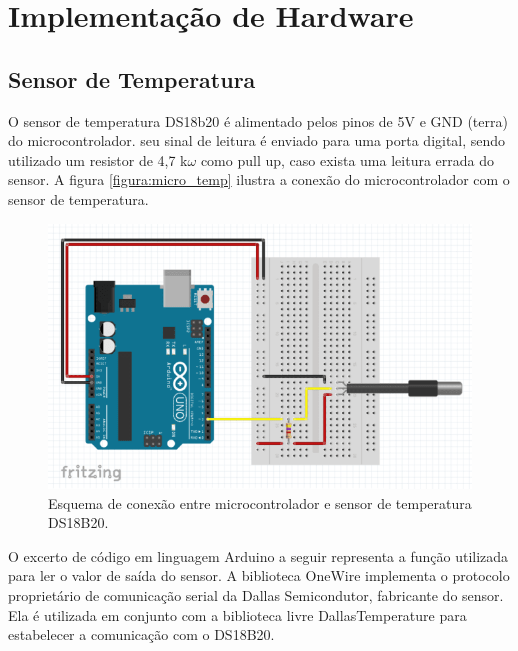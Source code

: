 \section{Implementação de Hardware}

\subsection{Sensor de Temperatura}

O sensor de temperatura DS18b20 é alimentado pelos pinos de 5V e GND (terra) do microcontrolador. seu sinal de leitura é enviado para uma porta digital, sendo utilizado um resistor de 4,7 k$\omega$ como pull up, caso exista uma leitura errada do sensor. A figura \ref{figura:micro_temp} ilustra a conexão do microcontrolador com o sensor de temperatura. 


\begin{figure}[h]
    \centering
    \includegraphics[scale=0.40]{figuras/implementacao/hardware/DSsensor.png}
    \caption{Esquema de conexão entre microcontrolador e sensor de temperatura DS18B20.}
    \label{fig:micro_temp}
\end{figure}


O excerto de código em linguagem Arduino a seguir representa a função utilizada para ler o valor de saída do sensor. A biblioteca OneWire implementa o protocolo proprietário de comunicação serial da Dallas Semicondutor, fabricante do sensor. Ela é utilizada em conjunto com a biblioteca livre DallasTemperature para estabelecer a comunicação com o DS18B20.


